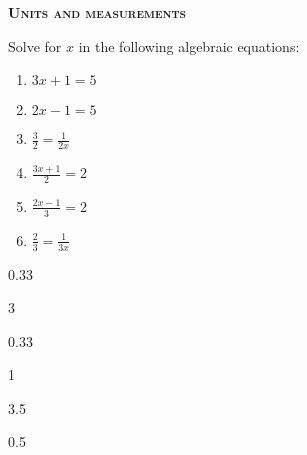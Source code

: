 \documentclass[main.tex]{subfiles}
\begin{document}
\newpage
\setdoublesep{0.35700 em}  %
\setatomsep{1.78500 em}    %
\setbondoffset{0.18265 em} %
\newcommand{\bondwidth}{0.06642 em} %
\setbondstyle{line width = \bondwidth}
\fancyhfoffset[E,O]{0pt}
\setlength{\columnsep}{30pt}
\begin{conclusion}
\end{conclusion}
\begin{multicols*}{2}\setcounter{numA}{1}



{\raggedright\textsc{\textbf{Units and measurements }}\par}


\begin{question}[ID=\the\value{numA}]
Solve for $x$ in the following algebraic equations:
 \begin{multicols}{2}
 \noindent
  \begin{enumerate} [topsep=0pt, partopsep=1pt, label=(\alph*), leftmargin=1cm]	
\item $3x+1=5$
\item $2x-1=5$
\item $\frac{3}{2}=\frac{1}{2x}$
\item $\frac{3x+1}{2}=2$
\item $\frac{2x-1}{3}=2$
\item $\frac{2}{3}=\frac{1}{3x}$
\end{enumerate}
\end{multicols}
\end{question}
\begin{solution}
\begin{inparaenum}[(a)]
  \item 0.33
    \item 3
\item 0.33
\item 1
\item 3.5
\item 0.5
 \end{inparaenum}
\hspace{0.1cm}\end{solution}%



\end{multicols*}
\end{document}
